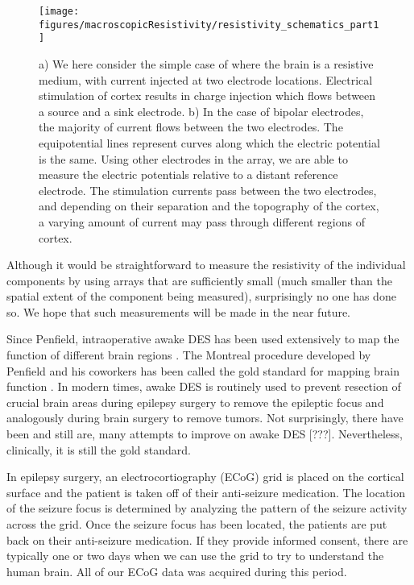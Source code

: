 \begin{figure}[ht]
	\centering
	\texttt{[image: figures/macroscopicResistivity/resistivity\_schematics\_part1]}
	\caption[What is the resistance of the human brain?]{a) We here consider the simple case of where the brain is a resistive medium, with current injected at two electrode locations. Electrical stimulation of cortex results in charge injection which flows between a source and a sink electrode. b) In the case of bipolar electrodes, the majority of current flows between the two electrodes. The equipotential lines represent curves along which the electric potential is the same. Using other electrodes in the array, we are able to measure the electric potentials relative to a distant reference electrode.  The stimulation currents pass between the two electrodes, and depending on their separation and the topography of the cortex, a varying amount of current may pass through different regions of cortex. }
	\label{fig:mrModelingOverview}
\end{figure}


Although it would be straightforward to measure the resistivity of the individual components by using arrays that are sufficiently small (much smaller than the spatial extent of the component being measured), surprisingly no one has done so. We hope that such measurements will be made in the near future.

Since Penfield, intraoperative awake DES has been used extensively to map the function of different brain regions \cite{Penfield1937}. The Montreal procedure developed by Penfield and his coworkers has been called the gold standard for mapping brain function \cite{Borchers2012}. In modern times, awake DES is routinely used to prevent resection of crucial brain areas during epilepsy surgery to remove the epileptic focus and analogously during brain surgery to remove tumors. Not surprisingly, there have been and still are, many attempts to improve on awake DES [???]. Nevertheless, clinically, it is still the gold standard.

In epilepsy surgery, an electrocortiography (ECoG) grid is placed on the cortical surface and the patient is taken off of their anti-seizure medication. The location of the seizure focus is determined by analyzing the pattern of the seizure activity across the grid. Once the seizure focus has been located, the patients are put back on their anti-seizure medication. If they provide informed consent, there are typically one or two days when we can use the grid to try to understand the human brain. All of our ECoG data was acquired during this period.

